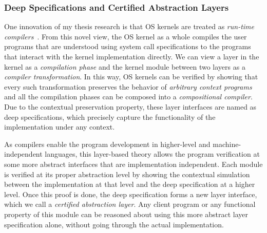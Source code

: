 \documentclass[a4paper, 10pt]{article}
\begin{document}
\begin{small}
\subsubsection*{\small Deep Specifications and Certified Abstraction Layers}
\begin{comment}
Modern OS kernels are designed and constructed using a
stack of \emph{abstraction layers},
each of which defines an interface that hides the underlying implementation
details. Client programs can be understood solely based on the interface,
independent of the layer implementation. Despite their huge contributions
to the computer industry,
abstraction layers have mostly been treated as a system
concept; before our work, they have almost never been formally specified or verified.
\end{comment}
One innovation of my thesis research is that  OS kernels are treated as \emph{run-time compilers}~\cite{popl15-gu}.
From this novel view,
the OS kernel as a whole compiles the
user programs that are understood using system call specifications  to the programs that interact 
with the kernel implementation directly.
We can view a layer in the kernel as a \emph{compilation phase}
and the kernel module between two layers as a \emph{compiler transformation}.
In this way,  OS kernels can be verified by showing that
every such transformation
preserves the behavior of \emph{arbitrary context programs}
and all the compilation phases can be composed into a \emph{compositional compiler}.
Due to the contextual preservation property,
these layer interfaces are named
as deep specifications, which precisely capture the functionality of the implementation under any context.


As compilers enable the program development
in higher-level and machine-independent languages,
this layer-based theory allows the program verification 
at some more abstract interfaces that are implementation independent. Each module is verified
at its proper abstraction level by showing the contextual
simulation between the implementation at that level
and the deep specification at a higher level.
Once this proof is done, the deep specification forms a new layer interface, which we call a \emph{certified abstraction layer}.
Any client program or any functional property of this module
can be reasoned about using this more abstract  layer specification alone, without going through the actual implementation.


\end{small}
\end{document}
